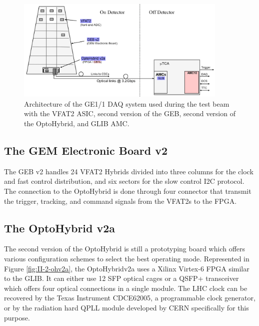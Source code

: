     \begin{figure}[t!]
      \centering
      \includegraphics[width=0.9\textwidth]{img/II-2-daq/gem-system-v2a.pdf}
      \caption{Architecture of the GE1/1 DAQ system used during the test beam with the VFAT2 ASIC, second version of the GEB, second version of the OptoHybrid, and GLIB AMC.}
      \label{fig:II-2-gem-system-v2a}
    \end{figure}

    \subsection{The GEM Electronic Board v2}

      The GEB v2 handles 24 VFAT2 Hybrids divided into three columns for the clock and fast control distribution, and six sectors for the slow control I2C protocol. The connection to the OptoHybrid is done through four connector that transmit the trigger, tracking, and command signals from the VFAT2s to the FPGA.

    \subsection{The OptoHybrid v2a}

      The second version of the OptoHybrid is still a prototyping board which offers various configuration schemes to select the best operating mode. Represented in Figure \ref{fig:II-2-ohv2a}, the OptoHybridv2a uses a Xilinx Virtex-6 FPGA similar to the GLIB. It can either use 12 SFP optical cages or a QSFP+ transceiver which offers four optical connections in a single module. The LHC clock can be recovered by the Texas Instrument CDCE62005, a programmable clock generator, or by the radiation hard QPLL module developed by CERN specifically for this purpose.

